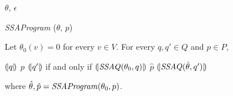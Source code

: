 \begin{algorithm}
  \begin{algorithmic}[1]
      \Case{$\epsilon$}
        \Return $\theta$, $\epsilon$
      \EndCase
      \EndCase
    \EndMatch
  \end{algorithmic}
  \caption{\textit{SSAProgram} ($\theta$, $p$)}
\end{algorithm}

\begin{theorem}
  Let $\theta_0(v) = 0$ for every $v \in V$. For every $q, q' \in Q$
  and $p \in P$,
  \begin{center}
    ${(\!|}{q}{|\!)}$ $p$ ${(\!|}{q'}{|\!)}$ if and only if
    ${(\!|}{\textmd{\textit{SSAQ}}(\theta_0, q)}{|\!)}$
    $\hat{p}$
    ${(\!|}{\textmd{\textit{SSAQ}}(\hat{\theta}, q')}{|\!)}$
  \end{center}
  where $\hat{\theta}, \hat{p} =
  \textmd{\textit{SSAProgram}}(\theta_0, p)$.
\end{theorem}